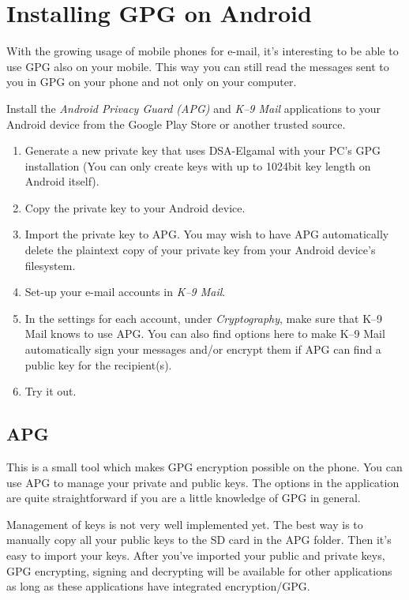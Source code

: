\section{Installing GPG on Android}

With the growing usage of mobile phones for e-mail, it's interesting to
be able to use GPG also on your mobile. This way you can still read the
messages sent to you in GPG on your phone and not only on your computer.

Install the \emph{Android Privacy Guard (APG)} and \emph{K--9 Mail}
applications to your Android device from the Google Play Store or
another trusted source.

\begin{enumerate}[1.]
\item
  Generate a new private key that uses DSA-Elgamal with your PC's GPG
  installation (You can only create keys with up to 1024bit key length
  on Android itself).
\item
  Copy the private key to your Android device.
\item
  Import the private key to APG. You may wish to have APG automatically
  delete the plaintext copy of your private key from your Android
  device's filesystem.
\item
  Set-up your e-mail accounts in \emph{K--9 Mail}.
\item
  In the settings for each account, under \emph{Cryptography}, make sure
  that K--9 Mail knows to use APG. You can also find options here to
  make K--9 Mail automatically sign your messages and/or encrypt them if
  APG can find a public key for the recipient(s).
\item
  Try it out.
\end{enumerate}
\subsection{APG}

This is a small tool which makes GPG encryption possible on the phone.
You can use APG to manage your private and public keys. The options in
the application are quite straightforward if you are a little knowledge
of GPG in general.

Management of keys is not very well implemented yet. The best way is to
manually copy all your public keys to the SD card in the APG folder.
Then it's easy to import your keys. After you've imported your public
and private keys, GPG encrypting, signing and decrypting will be
available for other applications as long as these applications have
integrated encryption/GPG.

